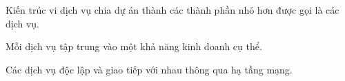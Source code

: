 Kiến trúc vi dịch vụ chia dự án thành các thành phần nhỏ hơn được gọi là các dịch vụ.

Mỗi dịch vụ tập trung vào một khả năng kinh doanh cụ thể.

Các dịch vụ độc lập và giao tiếp với nhau thông qua hạ tầng mạng.

%



%
 



  


